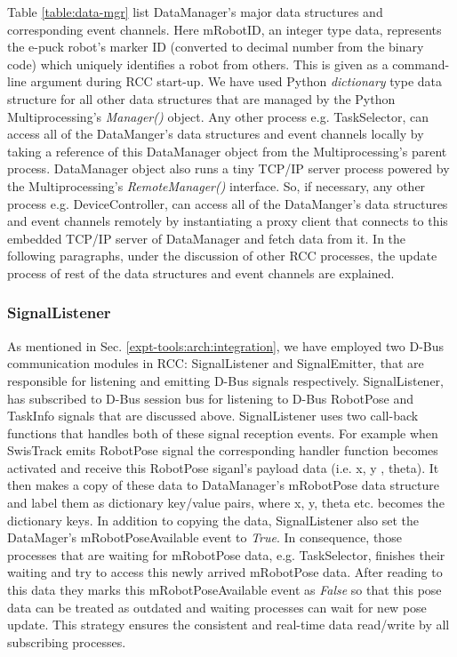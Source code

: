 Table \ref{table:data-mgr} list DataManager's major data structures and corresponding event channels. Here mRobotID, an integer type data,  represents the e-puck robot's marker ID (converted to decimal number from the binary code) which uniquely identifies a robot from others. This is given as a command-line argument during RCC start-up. We have used Python {\em dictionary} type data structure for all other data structures that are managed by the Python Multiprocessing's {\em Manager()} object. Any other process e.g. TaskSelector, can access all of the DataManger's data structures and event channels locally  by taking a reference of this DataManager object from the Multiprocessing's parent process. DataManager object also runs a tiny TCP/IP server process powered by the Multiprocessing's {\em RemoteManager()} interface. So, if necessary,  any other process e.g. DeviceController, can access all of the DataManger's data structures and event channels remotely by instantiating a proxy client  that connects to this embedded TCP/IP server of DataManager and  fetch data from it. In the following paragraphs, under the discussion of other RCC processes, the update process of rest of the data structures and event channels are explained.
\subsubsection*{SignalListener}
As mentioned in Sec. \ref{expt-tools:arch:integration}, we have employed two D-Bus communication modules in RCC: SignalListener and SignalEmitter, that are responsible for listening and emitting D-Bus signals respectively. SignalListener, has subscribed to D-Bus session bus for listening  to D-Bus RobotPose and TaskInfo signals that are discussed above. SignalListener uses two call-back functions that handles both of these signal reception events. For example when SwisTrack emits RobotPose signal  the corresponding handler function becomes activated and receive this RobotPose siganl's payload data (i.e. x, y , theta). It then makes a copy of these data  to DataManager's mRobotPose data structure and label them as dictionary key/value pairs, where x, y, theta etc. becomes the dictionary keys. In addition to copying the data, SignalListener also set the DataMager's   mRobotPoseAvailable event to {\em True}. In consequence, those processes that are waiting for mRobotPose data, e.g. TaskSelector, finishes their waiting and try to access this newly arrived mRobotPose data. After reading to this data they marks this mRobotPoseAvailable event as  {\em False} so that this pose data can be treated as outdated and waiting processes can wait for new pose update. This strategy ensures the consistent and real-time data read/write by all subscribing processes.
